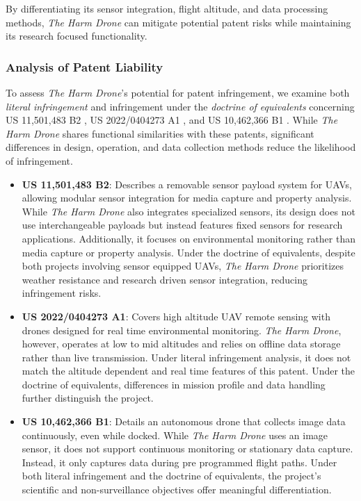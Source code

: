 \documentclass[12pt]{article}
\begin{document}
\par By differentiating its sensor integration, flight altitude, and data processing methods, \textit{The Harm Drone} can mitigate potential patent risks while maintaining its research focused functionality.

\subsubsection{Analysis of Patent Liability}

\par To assess \textit{The Harm Drone}'s potential for patent infringement, we examine both \textit{literal infringement} and infringement under the \textit{doctrine of equivalents} concerning US 11,501,483 B2 \cite{patent1}, US 2022/0404273 A1 \cite{patent2}, and US 10,462,366 B1 \cite{patent3}. While \textit{The Harm Drone} shares functional similarities with these patents, significant differences in design, operation, and data collection methods reduce the likelihood of infringement.

\begin{itemize}
    \item \textbf{US 11,501,483 B2}: Describes a removable sensor payload system for UAVs, allowing modular sensor integration for media capture and property analysis. While \textit{The Harm Drone} also integrates specialized sensors, its design does not use interchangeable payloads but instead features fixed sensors for research applications. Additionally, it focuses on environmental monitoring rather than media capture or property analysis. Under the doctrine of equivalents, despite both projects involving sensor equipped UAVs, \textit{The Harm Drone} prioritizes weather resistance and research driven sensor integration, reducing infringement risks.

    \item \textbf{US 2022/0404273 A1}: Covers high altitude UAV remote sensing with drones designed for real time environmental monitoring. \textit{The Harm Drone}, however, operates at low to mid altitudes and relies on offline data storage rather than live transmission. Under literal infringement analysis, it does not match the altitude dependent and real time features of this patent. Under the doctrine of equivalents, differences in mission profile and data handling further distinguish the project.

    \item \textbf{US 10,462,366 B1}: Details an autonomous drone that collects image data continuously, even while docked. While \textit{The Harm Drone} uses an image sensor, it does not support continuous monitoring or stationary data capture. Instead, it only captures data during pre programmed flight paths. Under both literal infringement and the doctrine of equivalents, the project's scientific and non-surveillance objectives offer meaningful differentiation.
\end{itemize}
\end{document}
